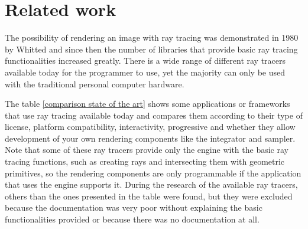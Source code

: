 \section{Related work}

\par
The possibility of rendering an image with ray tracing was demonstrated in 1980 by Whitted and since then the number of libraries that provide basic ray tracing functionalities increased greatly.
There is a wide range of different ray tracers available today for the programmer to use, yet the majority can only be used with the traditional personal computer hardware.

\par
The table \ref{comparison state of the art} shows some applications or frameworks that use ray tracing available today and compares them according to their type of license, platform compatibility, interactivity, progressive and whether they allow development of your own rendering components like the integrator and sampler.
Note that some of these ray tracers provide only the engine with the basic ray tracing functions, such as creating rays and intersecting them with geometric primitives, so the rendering components are only programmable if the application that uses the engine supports it.
During the research of the available ray tracers, others than the ones presented in the table were found, but they were excluded because the documentation was very poor without explaining the basic functionalities provided or because there was no documentation at all.

